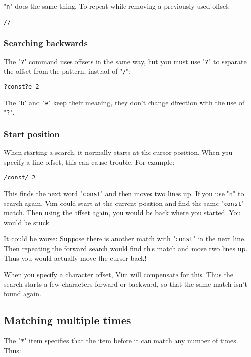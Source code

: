 "\texttt{n}" does the same thing.
To repeat while removing a previously used offset:

\begin{Verbatim}[samepage=true]
 //
\end{Verbatim}

\subsubsection{Searching backwards}
The "\texttt{?}" command uses offsets in the same way, but you must use "\texttt{?}" to separate the offset from the pattern, instead of "\texttt{/}":

\begin{Verbatim}[samepage=true]
 ?const?e-2
\end{Verbatim}

The "\texttt{b}" and "\texttt{e}" keep their meaning, they don't change direction with the use of "\texttt{?}".
\subsubsection{Start position}
When starting a search, it normally starts at the cursor position.
When you specify a line offset, this can cause trouble.
For example:

\begin{Verbatim}[samepage=true]
 /const/-2
\end{Verbatim}

This finds the next word "\texttt{const}" and then moves two lines up.
If you use "\texttt{n}" to search again, Vim could start at the current position and find the same "\texttt{const}" match.
Then using the offset again, you would be back where you started.
You would be stuck!

It could be worse: Suppose there is another match with "\texttt{const}" in the next line.
Then repeating the forward search would find this match and move two lines up.
Thus you would actually move the cursor back!

When you specify a character offset, Vim will compensate for this.
Thus the search starts a few characters forward or backward, so that the same match isn't found again.
\subsection{Matching multiple times}
The "\texttt{*}" item specifies that the item before it can match any number of times.
Thus:

